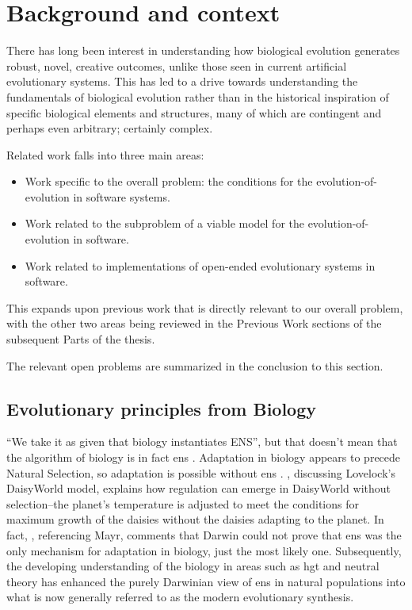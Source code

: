\section{Background and context}\label{background-and-context}

There has long been interest in understanding how biological evolution generates robust, novel, creative outcomes, unlike those seen in current artificial evolutionary systems. This has led to a drive towards understanding the fundamentals of biological evolution rather than in the historical inspiration of specific biological elements and structures, many of which are contingent and perhaps even arbitrary; certainly complex.

Related work falls into three main areas:

\begin{itemize}
\item Work specific to the overall problem: the conditions for the evolution-of-evolution in software systems.
\item Work related to the subproblem of a viable model for the evolution-of-evolution in software.
\item Work related to implementations of open-ended evolutionary systems in software.
\end{itemize}
	
This  expands upon previous work that is directly relevant to our overall problem, with the other two areas being reviewed in the Previous Work sections of the subsequent Parts of the thesis. 

The relevant open problems are summarized in the conclusion to this section.

\subsection{Evolutionary principles from Biology}

``We take it as given that biology instantiates ENS'', but that doesn't mean that the algorithm of biology is in fact \gls{ens} \parencite{Watson2012}. Adaptation in biology appears to precede Natural Selection, so adaptation is possible without \gls{ens} \cite{Watson2010}. \cite{Saunders1994}, discussing Lovelock's DaisyWorld model, explains how regulation can emerge in DaisyWorld without selection--the planet's temperature is adjusted to meet the conditions for maximum growth of the daisies without the daisies adapting to the planet. In fact, \cite{Saunders1994}, referencing Mayr, comments that Darwin could not prove that \gls{ens} was the only mechanism for adaptation in biology, just the most likely one. Subsequently, the developing understanding of the biology in areas such as \gls{hgt} and neutral theory \cite{Kimura:1968uq} has enhanced the purely Darwinian view of \gls{ens} in natural populations into what is now generally referred to as the modern evolutionary synthesis.

